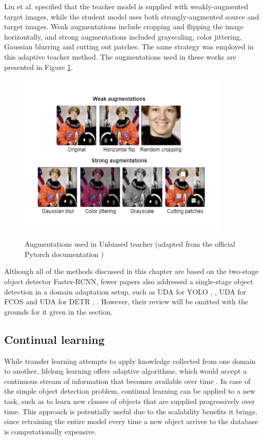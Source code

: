 \documentclass[english, 12pt, a4paper, elec, utf8, a-1b, online]{aaltothesis}
\begin{document}
Liu et al. \cite{Liu2021} specified that the teacher model is supplied with weakly-augmented target images, while the student model uses both strongly-augmented source and target images. Weak augmentations include cropping and flipping the image horizontally, and strong augmentations included grayscaling, color jittering, Gaussian blurring and cutting out patches. The same strategy was employed in this adaptive teacher method. The augmentations used in these works  \cite{Li2021, Liu2021} are presented in Figure \ref{augmentations}. 
\begin{figure}[htb]
	\begin{center}
		\includegraphics[width=10cm]{./augmentations.png}
	\end{center}
	\caption{Augmentations used in Unbiased teacher (adapted from the official Pytorch documentation \cite{pytorch})}
	\begin{center}
		\label{augmentations}
	\end{center}
\end{figure}


Although all of the methods discussed in this chapter are based on the two-stage object detector Faster-RCNN, fewer papers also addressed a single-stage object detection in a domain adaptation setup, such as UDA for YOLO \cite{Hnewa2021}, \cite{Zhang2021a}, UDA for FCOS \cite{fcos1} and UDA for DETR \cite{Zhang2021b}, \cite{Vidit2021}. However, their review will be omitted with the grounds for it given in the  section. 

\subsection{Continual learning}
\label{cont_learning} 
While transfer learning attempts to apply knowledge collected from one domain to another, lifelong learning offers adaptive algorithms, which  would accept a continuous stream of information that becomes available over time \cite{Parisi2018}. In case of the simple object detection problem, continual learning can be applied to a new task, such as to learn new classes of objects that are supplied progressively over time. This approach is potentially useful due to the scalability benefits it brings, since retraining the entire model every time a new object arrives to the database is computationally expensive. 
\end{document}
